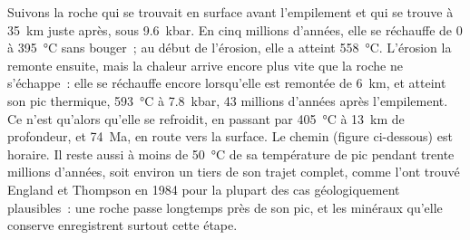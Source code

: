 Suivons la roche qui se trouvait en surface avant l'empilement et qui se trouve à \qty{35}{km} juste
après, sous \qty{9.6}{kbar}. En cinq millions d'années, elle se réchauffe de 0 à
\qty{395}{\celsius} sans bouger~; au début de l'érosion, elle a atteint
\qty{558}{\celsius}. L'érosion la remonte ensuite, mais la chaleur arrive encore plus vite
que la roche ne s'échappe~: elle se réchauffe encore lorsqu'elle est remontée de \qty{6}{km}, et atteint son
pic thermique, \qty{593}{\celsius} à \qty{7.8}{kbar}, 43 millions d'années après l'empilement. Ce n'est
qu'alors qu'elle se refroidit, en passant par \qty{405}{\celsius} à \qty{13}{km} de profondeur, et
\qty{74}{Ma}, en route vers la surface. Le chemin (figure ci-dessous) est horaire. Il reste aussi
à moins de \qty{50}{\celsius} de sa température de pic pendant trente millions d'années, soit environ un
tiers de son trajet complet, comme l'ont trouvé England et Thompson en 1984 pour la plupart des cas
géologiquement plausibles~: une roche passe longtemps près de son pic, et les minéraux qu'elle conserve
enregistrent surtout cette étape.

